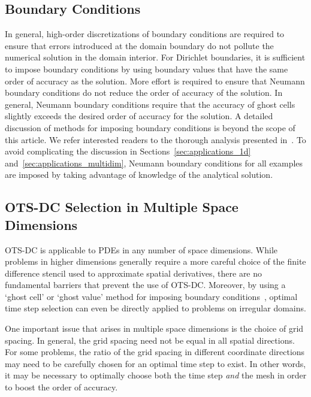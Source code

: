 \documentclass[fleqn,12pt,twoside]{article}
\begin{document}
\subsection{Boundary Conditions}
In general, high-order discretizations of boundary conditions are required 
to ensure that errors introduced at the domain boundary do not pollute 
the numerical solution in the domain interior.  For Dirichlet boundaries, 
it is sufficient to impose boundary conditions by using boundary values 
that have the same order of accuracy as the solution.  More effort is 
required to ensure that Neumann boundary conditions do not reduce the order 
of accuracy of the solution.  In general, Neumann boundary conditions require 
that the accuracy of ghost cells slightly exceeds the desired order of 
accuracy for the solution.  A detailed discussion of methods for imposing 
boundary conditions is beyond the scope of this article.  We refer interested 
readers to the thorough analysis presented in~\cite{gko_book}.  To avoid 
complicating the discussion in Sections~\ref{sec:applications_1d} 
and~\ref{sec:applications_multidim}, Neumann boundary conditions for
all examples are imposed by taking advantage of knowledge of the analytical 
solution.


\subsection{\label{sec:ots_dc_higher_spatial_dims}
            OTS-DC Selection in Multiple Space Dimensions}
OTS-DC is applicable to PDEs in any number of space dimensions.  While 
problems in higher dimensions generally require a more careful choice of the 
finite difference stencil used to approximate spatial derivatives, there are 
no fundamental barriers that prevent the use of OTS-DC.  Moreover, by using 
a `ghost cell' or `ghost value' method for imposing boundary 
conditions~\cite{gibou_2005,ito_2005,fedkiw_1999,osher_fedkiw_book},
optimal time step selection can even be directly applied to problems on 
irregular domains.  

One important issue that arises in multiple space dimensions is the choice
of grid spacing.  In general, the grid spacing need not be equal in all 
spatial directions.  For some problems, the ratio of the grid spacing in
different coordinate directions may need to be carefully chosen for an 
optimal time step to exist.  In other words, it may be necessary to optimally 
choose both the time step \emph{and} the mesh in order to boost the order 
of accuracy.
\end{document}
